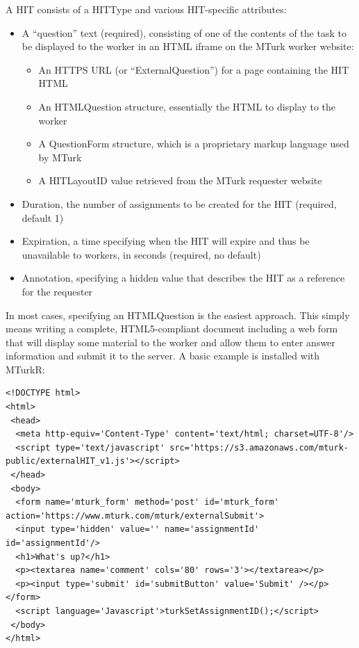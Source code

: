 A HIT consists of a HITType and various HIT-specific attributes:

\begin{itemize}
\item A ``question'' text (required), consisting of one of the contents of the task to be displayed to the worker in an HTML iframe on the MTurk worker website:
	\begin{itemize}
		\item An HTTPS URL (or ``ExternalQuestion'') for a page containing the HIT HTML
		\item An HTMLQuestion structure, essentially the HTML to display to the worker
		\item A QuestionForm structure, which is a proprietary markup language used by MTurk
		\item A HITLayoutID value retrieved from the MTurk requester website
	\end{itemize}
\item Duration, the number of assignments to be created for the HIT (required, default 1)
\item Expiration, a time specifying when the HIT will expire and thus be unavailable to workers, in seconds (required, no default)
\item Annotation, specifying a hidden value that describes the HIT as a reference for the requester
\end{itemize}

In most cases, specifying an HTMLQuestion is the easiest approach. This simply means writing a complete, HTML5-compliant document including a web form that will display some material to the worker and allow them to enter answer information and submit it to the server. A basic example is installed with MTurkR:

\begin{verbatim}
<!DOCTYPE html>
<html>
 <head>
  <meta http-equiv='Content-Type' content='text/html; charset=UTF-8'/>
  <script type='text/javascript' src='https://s3.amazonaws.com/mturk-public/externalHIT_v1.js'></script>
 </head>
 <body>
  <form name='mturk_form' method='post' id='mturk_form' action='https://www.mturk.com/mturk/externalSubmit'>
  <input type='hidden' value='' name='assignmentId' id='assignmentId'/>
  <h1>What's up?</h1>
  <p><textarea name='comment' cols='80' rows='3'></textarea></p>
  <p><input type='submit' id='submitButton' value='Submit' /></p></form>
  <script language='Javascript'>turkSetAssignmentID();</script>
 </body>
</html>
\end{verbatim}

